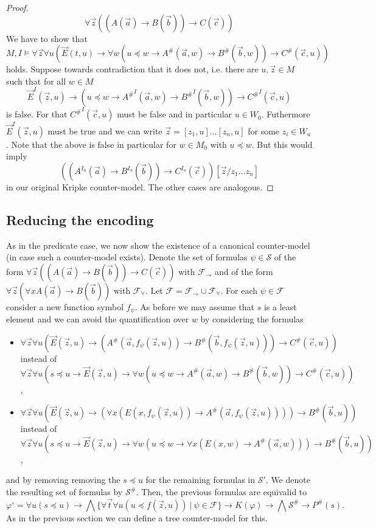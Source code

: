 \documentclass[a4paper,11pt]{report}
\theoremstyle{definition}
\theoremstyle{definition}
\theoremstyle{definition}
\theoremstyle{definition}
\theoremstyle{definition}
\theoremstyle{definition}
\theoremstyle{definition}
\begin{document}
\begin{proof}
		$$ \forall \vec z((A(\vec a)\to B(\vec b))\to C(\vec c))$$
		We have to show that
		$$M, I\models \forall \vec z\forall u(\vec E(t, u)\to \forall w(u\preceq w\to A^\#(\vec a, w)\to B^\#(\vec b, w))\to C^\#(\vec c, u))$$
		holds. Suppose towards contradiction that it does not, i.e. there are $u, \vec z\in M$ such that for all $w\in M$
		$$\vec E^I(\vec z, u)\to (u\preceq w\to {A^\#}^I(\vec a, w)\to {B^\#}^I(\vec b, w))\to {C^\#}^I(\vec c, u)$$ is false. For that ${C^\#}^I(\vec c, u)$ must be false and in particular $u\in W_0$. Futhermore $\vec E^I(\vec z, u)$ must be true and we can write $\vec z = [z_1, u]\dots[z_n, u]$ for some $z_i\in W_u$. Note that the above is false in particular for $w\in M_0$ with $u\preceq w$. But this would imply
		$$((A^{I_u}(\vec a)\to B^{I_u}(\vec b))\to C^{I_u}(\vec c))[\vec z/z_1\dots z_n]$$in our original Kripke counter-model. The other cases are analogous.
	\end{proof}
	
	\subsection{Reducing the encoding}
	
	As in the predicate case, we now show the existence of a canonical counter-model (in case such a counter-model exists). Denote the set of formulas $\psi\in\mathcal S$ of the form $\forall\vec z((A(\vec a)\to B(\vec b))\to C(\vec c))$ with $\mathcal F_\to$ and of the form $\forall \vec z(\forall xA(\vec a)\to B(\vec b))$ with $\mathcal F_\forall$. Let $\mathcal F = \mathcal F_\to\cup\mathcal F_\forall$. For each  $\psi\in\mathcal F$ consider a new function symbol $f_\psi$. As before we may assume that $s$ is a least element and we can avoid the quantification over $w$ by considering the formulas
	\begin{itemize}
		\item $\forall \vec z\forall u(\vec E(\vec z, u)\to (A^\#(\vec a, f_\psi(\vec z, u))\to B^\#(\vec b, f_\psi(\vec z, u)))\to C^\#(\vec c, u))$\\instead of $\forall \vec z\forall u(s\preceq u\to\vec E(\vec z, u)\to \forall w(u\preceq w\to A^\#(\vec a, w)\to B^\#(\vec b, w))\to C^\#(\vec c, u))$,
		\item $\forall \vec z\forall u(\vec E(\vec z, u)\to (\forall x(E(x, f_\psi(\vec z, u))\to A^\#(\vec a, f_\psi(\vec z, u))))\to B^\#(\vec b, u))$\\instead of $\forall \vec z\forall u(s\preceq u\to\vec E(\vec z, u)\to \forall w(u\preceq w\to \forall x(E(x, w)\to A^\#(\vec a, w)))\to B^\#(\vec b, u))$,
	\end{itemize}
	and by removing removing the $s\preceq u$ for the remaining formulas in $\mathcal S'$.
	We denote the resulting set of formulas by $\mathcal S^\#$.
	Then, the previous formulas are equivalid to
	$$\varphi^\circ= \forall u(s\preceq u)\to \bigwedge\{\forall \vec t\forall u(u\preceq f(\vec z, u))\:|\:\psi\in\mathcal F\}\to K(\varphi)\to\bigwedge\mathcal S^\#\to P^\#(s).$$
	As in the previous section we can define a tree counter-model for this.
	
\end{document}
